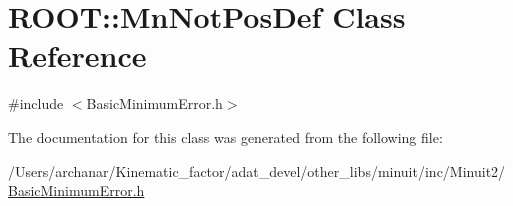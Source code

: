 \hypertarget{classROOT_1_1Minuit2_1_1BasicMinimumError_1_1MnNotPosDef}{}\section{R\+O\+OT\+:\+:Mn\+Not\+Pos\+Def Class Reference}
\label{classROOT_1_1Minuit2_1_1BasicMinimumError_1_1MnNotPosDef}


{\ttfamily \#include $<$Basic\+Minimum\+Error.\+h$>$}



The documentation for this class was generated from the following file\+:\begin{DoxyCompactItemize}
\item 
/\+Users/archanar/\+Kinematic\+\_\+factor/adat\+\_\+devel/other\+\_\+libs/minuit/inc/\+Minuit2/\mbox{\hyperlink{other__libs_2minuit_2inc_2Minuit2_2BasicMinimumError_8h}{Basic\+Minimum\+Error.\+h}}\end{DoxyCompactItemize}
